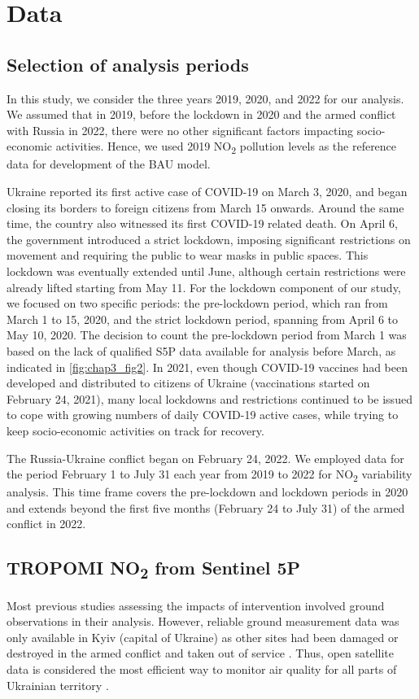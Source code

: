 \section{Data} \label{chap3_data}
\subsection{Selection of analysis periods}
In this study, we consider the three years 2019, 2020, and 2022 for our analysis. We assumed that in 2019, before the lockdown in 2020 and the armed conflict with Russia in 2022, there were no other significant factors impacting socio-economic activities. Hence, we used 2019 NO\textsubscript{2} pollution levels as the reference data for development of the BAU model. \par
Ukraine reported its first active case of COVID-19 on March 3, 2020, and began closing its borders to foreign citizens from March 15 onwards. Around the same time, the country also witnessed its first COVID-19 related death. On April 6, the government introduced a strict lockdown, imposing significant restrictions on movement and requiring the public to wear masks in public spaces. This lockdown was eventually extended until June, although certain restrictions were already lifted starting from May 11. For the lockdown component of our study, we focused on two specific periods: the pre-lockdown period, which ran from March 1 to 15, 2020, and the strict lockdown period, spanning from April 6 to May 10, 2020. The decision to count the pre-lockdown period from March 1 was based on the lack of qualified S5P data available for analysis before March, as indicated in \ref{fig:chap3_fig2}. In 2021, even though COVID-19 vaccines had been developed and distributed to citizens of Ukraine (vaccinations started on February 24, 2021), many local lockdowns and restrictions continued to be issued to cope with growing numbers of daily COVID-19 active cases, while trying to keep socio-economic activities on track for recovery. \par
The Russia-Ukraine conflict began on February 24, 2022. We employed data for the period February 1 to July 31 each year from 2019 to 2022 for NO\textsubscript{2} variability analysis. This time frame covers the pre-lockdown and lockdown periods in 2020 and extends beyond the first five months (February 24 to July 31) of the armed conflict in 2022.\par
\subsection{TROPOMI NO\textsubscript{2} from Sentinel 5P}
Most previous studies assessing the impacts of intervention involved ground observations in their analysis. However, reliable ground measurement data was only available in Kyiv (capital of Ukraine) as other sites had been damaged or destroyed in the armed conflict and taken out of service \citep{savenets2021air}. Thus, open satellite data is considered the most efficient way to monitor air quality for all parts of Ukrainian territory \citep{shelestov2021air}. \par

